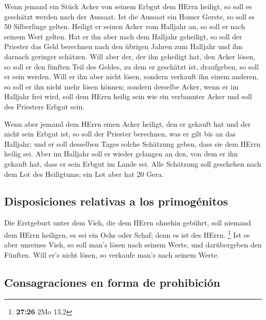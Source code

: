  Wenn jemand ein Stück Acker von seinem Erbgut dem HErrn
heiligt, so soll es geschätzt werden nach der Aussaat. Ist die Aussaat
ein Homer Gerste, so soll es 50 Silberlinge gelten. 
Heiligt er seinen Acker vom Halljahr an, so soll er nach seinem Wert
gelten.  Hat er ihn aber nach dem Halljahr geheiligt, so
soll der Priester das Geld berechnen nach den übrigen Jahren zum
Halljahr und ihn darnach geringer schätzen.  Will aber
der, der ihn geheiligt hat, den Acker lösen, so soll er den fünften Teil
des Geldes, zu dem er geschätzt ist, draufgeben, so soll er sein werden.
 Will er ihn aber nicht lösen, sondern verkauft ihn einem
anderen, so soll er ihn nicht mehr lösen können;  sondern
derselbe Acker, wenn er im Halljahr frei wird, soll dem HErrn heilig
sein wie ein verbannter Acker und soll des Priesters Erbgut sein.

 Wenn aber jemand dem HErrn einen Acker heiligt, den er
gekauft hat und der nicht sein Erbgut ist,  so soll der
Priester berechnen, was er gilt bis an das Halljahr; und er soll
desselben Tages solche Schätzung geben, dass sie dem HErrn heilig sei.
 Aber im Halljahr soll er wieder gelangen an den, von dem
er ihn gekauft hat, dass er sein Erbgut im Lande sei. 
Alle Schätzung soll geschehen nach dem Lot des Heiligtums; ein Lot aber
hat 20 Gera.

\hypertarget{disposiciones-relativas-a-los-primoguxe9nitos}{%
\subsection{Disposiciones relativas a los
primogénitos}\label{disposiciones-relativas-a-los-primoguxe9nitos}}

 Die Erstgeburt unter dem Vieh, die dem HErrn ohnehin
gebührt, soll niemand dem HErrn heiligen, es sei ein Ochs oder Schaf;
denn es ist des HErrn. \footnote{\textbf{27:26} 2Mo 13,2}
 Ist es aber unreines Vieh, so soll man's lösen nach
seinem Werte, und darübergeben den Fünften. Will er's nicht lösen, so
verkaufe man's nach seinem Werte.

\hypertarget{consagraciones-en-forma-de-prohibiciuxf3n}{%
\subsection{Consagraciones en forma de
prohibición}\label{consagraciones-en-forma-de-prohibiciuxf3n}}


